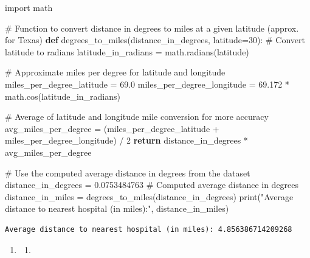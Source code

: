 \documentclass[
  letterpaper,
  DIV=11,
  numbers=noendperiod]{scrartcl}
\newenvironment{Shaded}{\begin{snugshade}}{\end{snugshade}}
\newcommand{\BuiltInTok}[1]{\textcolor[rgb]{0.00,0.23,0.31}{#1}}
\newcommand{\CommentTok}[1]{\textcolor[rgb]{0.37,0.37,0.37}{#1}}
\newcommand{\ControlFlowTok}[1]{\textcolor[rgb]{0.00,0.23,0.31}{\textbf{#1}}}
\newcommand{\DecValTok}[1]{\textcolor[rgb]{0.68,0.00,0.00}{#1}}
\newcommand{\FloatTok}[1]{\textcolor[rgb]{0.68,0.00,0.00}{#1}}
\newcommand{\ImportTok}[1]{\textcolor[rgb]{0.00,0.46,0.62}{#1}}
\newcommand{\KeywordTok}[1]{\textcolor[rgb]{0.00,0.23,0.31}{\textbf{#1}}}
\newcommand{\NormalTok}[1]{\textcolor[rgb]{0.00,0.23,0.31}{#1}}
\newcommand{\OperatorTok}[1]{\textcolor[rgb]{0.37,0.37,0.37}{#1}}
\newcommand{\StringTok}[1]{\textcolor[rgb]{0.13,0.47,0.30}{#1}}
\providecommand{\tightlist}{%
  \setlength{\itemsep}{0pt}\setlength{\parskip}{0pt}}\usepackage{longtable,booktabs,array}
\begin{document}
\begin{Shaded}
\begin{Highlighting}[]
\ImportTok{import}\NormalTok{ math}

\CommentTok{\# Function to convert distance in degrees to miles at a given latitude (approx. for Texas)}
\KeywordTok{def}\NormalTok{ degrees\_to\_miles(distance\_in\_degrees, latitude}\OperatorTok{=}\DecValTok{30}\NormalTok{):}
    \CommentTok{\# Convert latitude to radians}
\NormalTok{    latitude\_in\_radians }\OperatorTok{=}\NormalTok{ math.radians(latitude)}
    
    \CommentTok{\# Approximate miles per degree for latitude and longitude}
\NormalTok{    miles\_per\_degree\_latitude }\OperatorTok{=} \FloatTok{69.0}
\NormalTok{    miles\_per\_degree\_longitude }\OperatorTok{=} \FloatTok{69.172} \OperatorTok{*}\NormalTok{ math.cos(latitude\_in\_radians)}
    
    \CommentTok{\# Average of latitude and longitude mile conversion for more accuracy}
\NormalTok{    avg\_miles\_per\_degree }\OperatorTok{=}\NormalTok{ (miles\_per\_degree\_latitude }\OperatorTok{+}\NormalTok{ miles\_per\_degree\_longitude) }\OperatorTok{/} \DecValTok{2}
    \ControlFlowTok{return}\NormalTok{ distance\_in\_degrees }\OperatorTok{*}\NormalTok{ avg\_miles\_per\_degree}

\CommentTok{\# Use the computed average distance in degrees from the dataset}
\NormalTok{distance\_in\_degrees }\OperatorTok{=} \FloatTok{0.0753484763}  \CommentTok{\# Computed average distance in degrees}
\NormalTok{distance\_in\_miles }\OperatorTok{=}\NormalTok{ degrees\_to\_miles(distance\_in\_degrees)}
\BuiltInTok{print}\NormalTok{(}\StringTok{"Average distance to nearest hospital (in miles):"}\NormalTok{, distance\_in\_miles)}
\end{Highlighting}
\end{Shaded}

\begin{verbatim}
Average distance to nearest hospital (in miles): 4.856386714209268
\end{verbatim}

\begin{enumerate}
\def\labelenumi{\arabic{enumi}.}
\setcounter{enumi}{4}
\tightlist
\item
  \begin{enumerate}
  \def\labelenumii{\alph{enumii}.}
  \tightlist
  \item
  \end{enumerate}
\end{enumerate}
\end{document}
